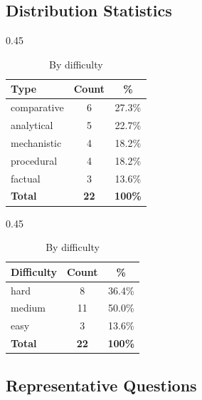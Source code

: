 \documentclass[12pt, a4paper]{article}
\begin{document}
\subsection{Distribution Statistics}

\begin{table}[ht]
\centering
\caption{Benchmark distribution (22 questions total)}
\begin{subtable}[t]{0.45\textwidth}
\centering
\caption{By question type}
\begin{tabular}{lcc}
\toprule
\textbf{Type} & \textbf{Count} & \textbf{\%} \\
\midrule
comparative & 6 & 27.3\% \\
analytical  & 5 & 22.7\% \\
mechanistic & 4 & 18.2\% \\
procedural  & 4 & 18.2\% \\
factual     & 3 & 13.6\% \\
\midrule
\textbf{Total} & \textbf{22} & \textbf{100\%} \\
\bottomrule
\end{tabular}
\end{subtable}
\hfill
\begin{subtable}[t]{0.45\textwidth}
\centering
\caption{By difficulty}
\begin{tabular}{lcc}
\toprule
\textbf{Difficulty} & \textbf{Count} & \textbf{\%} \\
\midrule
hard   & 8  & 36.4\% \\
medium & 11 & 50.0\% \\
easy   &  3 & 13.6\% \\
\midrule
\textbf{Total} & \textbf{22} & \textbf{100\%} \\
\bottomrule
\end{tabular}
\end{subtable}
\end{table}

\subsection{Representative Questions}
\end{document}
